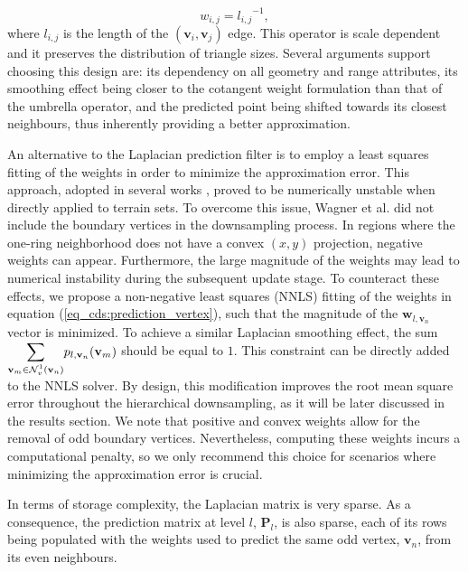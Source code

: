 \documentclass[graybox]{svmult}
\begin{document}
\begin{equation}
w_{i,j} = {l_{i,j}}^{-1}, 
\label{eq_cds:fujiwara}
\end{equation}
where $l_{i,j}$ is the length of the $(\mathbf{v}_i,\mathbf{v}_j)$ edge. This operator is scale dependent and it preserves the distribution of triangle sizes. Several arguments support choosing this design are: its dependency on all geometry and range attributes, its smoothing effect being closer to the cotangent weight formulation than that of the umbrella operator, and the predicted point being shifted towards its closest neighbours, thus inherently providing a better approximation.

An alternative to the Laplacian prediction filter is to employ a least squares fitting of the weights in order to minimize the approximation error. This approach, adopted in several works \cite{Wagner2005,Martinez2011}, proved to be numerically unstable when directly applied to terrain sets. To overcome this issue, Wagner et al. \cite{Wagner2005} did not include the boundary vertices in the downsampling process. In regions where the one-ring neighborhood does not have a convex  $(x,y)$ projection, negative weights can appear. Furthermore, the large magnitude of the weights may lead to numerical instability during the subsequent update stage. To counteract these effects, we propose  a non-negative least squares (NNLS) fitting of the weights in equation (\ref{eq_cds:prediction_vertex}), such that
the magnitude of the $\mathbf{w}_{l, \mathbf{v}_n}$ vector is minimized. To achieve a similar Laplacian smoothing effect, the sum $\mathlarger{\sum}_{\mathbf{v}_m \in \mathcal{N}_v^1(\mathbf{v}_n)}{ p_{l, \mathbf{v}_n}(\mathbf{v}_m)}$ should be equal to $1$. This constraint can be directly added to the NNLS solver. By design, this modification improves the root mean square error throughout the hierarchical downsampling, as it will be later discussed in the results section. We note that positive and convex weights allow for the removal of odd boundary vertices. Nevertheless, computing these weights incurs a computational penalty, so we only recommend this choice for scenarios where minimizing the approximation error is crucial.

In terms of storage complexity,  the Laplacian matrix is very sparse. As a consequence, the prediction matrix at level $l$, $\mathbf{P}_l$, is also sparse, each of its rows being populated with the weights used to predict the same odd vertex,
$\mathbf{v}_n$, from its even neighbours.
\end{document}
